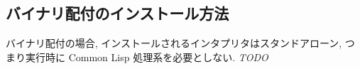 
\subsection{バイナリ配付のインストール方法}
バイナリ配付の場合, インストールされるインタプリタはスタンドアローン,
つまり実行時に Common Lisp 処理系を必要としない. 
\emph{TODO}
